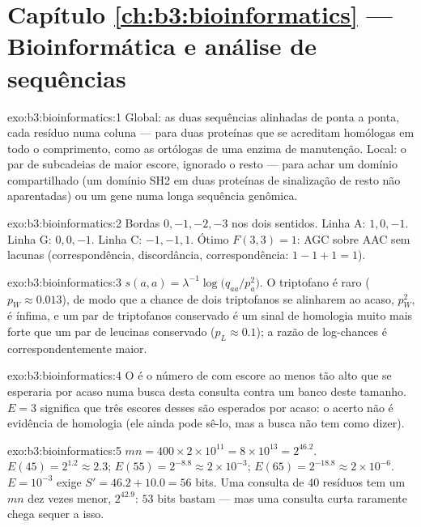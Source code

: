 \section*{Capítulo \ref{ch:b3:bioinformatics} --- Bioinformática e análise de sequências}

\begin{solution}{exo:b3:bioinformatics:1}
Global: as duas sequências alinhadas de ponta a ponta, cada resíduo
numa coluna --- para duas proteínas que se acreditam homólogas em todo
o comprimento, como as ortólogas de uma enzima de manutenção. Local: o
par de subcadeias de maior escore, ignorado o resto --- para achar um
domínio compartilhado (um domínio SH2 em duas proteínas de sinalização
de resto não aparentadas) ou um gene numa longa sequência genômica.
\end{solution}

\begin{solution}{exo:b3:bioinformatics:2}
Bordas $0,-1,-2,-3$ nos dois sentidos. Linha A: $1, 0, -1$. Linha G:
$0, 0, -1$. Linha C: $-1, -1, 1$. Ótimo $F(3,3) = 1$: AGC sobre AAC sem
lacunas (correspondência, discordância, correspondência:
$1 - 1 + 1 = 1$).
\end{solution}

\begin{solution}{exo:b3:bioinformatics:3}
$s(a,a) = \lambda^{-1}\log\bigl(q_{aa}/p_{a}^{2}\bigr)$. O triptofano é
raro ($p_{W} \approx 0.013$), de modo que a chance de dois triptofanos
se alinharem ao acaso, $p_{W}^{2}$, é ínfima, e um par de triptofanos
conservado é um sinal de homologia muito mais forte que um par de
leucinas conservado ($p_{L}
\approx 0.1$); a razão de log-chances é
correspondentemente maior.
\end{solution}

\begin{solution}{exo:b3:bioinformatics:4}
O  é o número de  com escore ao menos tão alto que
se esperaria por acaso numa busca desta consulta contra um banco deste
tamanho. $E = 3$ significa que três escores desses são esperados por
acaso: o acerto não é evidência de homologia (ele ainda pode sê-lo, mas
a busca não tem como dizer).
\end{solution}

\begin{solution}{exo:b3:bioinformatics:5}
$mn = 400\times 2\times 10^{11} = 8\times 10^{13} = 2^{46.2}$. $E(45) =
2^{1.2} \approx 2.3$; $E(55) = 2^{-8.8} \approx 2\times 10^{-3}$;
$E(65) = 2^{-18.8} \approx 2\times 10^{-6}$. $E = 10^{-3}$ exige
$S' =
46.2 + 10.0 = 56$ bits. Uma consulta de \num{40} resíduos tem um
$mn$ dez vezes menor, $2^{42.9}$: $53$ bits bastam --- mas uma consulta
curta raramente chega sequer a isso.
\end{solution}

